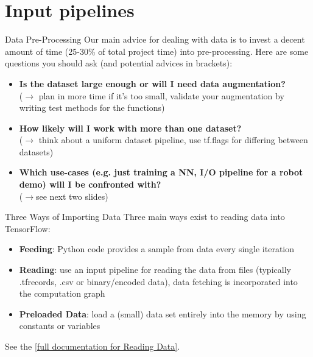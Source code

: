 \documentclass[18pt]{beamer}
\begin{document}
\section{Input pipelines}
\begin{frame}{Data Pre-Processing}
Our main advice for dealing with data is to invest a decent amount of time (25-30\% of total project time) into pre-processing. Here are some questions you should ask (and potential advices in brackets):
\begin{itemize}
\item \textbf{Is the dataset large enough or will I need data augmentation?}
\\($\rightarrow$ plan in more time if it's too small, validate your augmentation by writing test methods for the functions)
\pause
\item \textbf{How likely will I work with more than one dataset?}\\ ($\rightarrow$ think about a uniform dataset pipeline, use tf.flags for differing between datasets) 
\pause
\item \textbf{Which use-cases (e.g. just training a NN, I/O pipeline for a robot demo) will I be confronted with?} \\($\rightarrow$see next two slides)
\end{itemize}
 \end{frame}


\begin{frame}{Three Ways of Importing Data}
Three main ways exist to reading data into TensorFlow:
\begin{itemize}
\item \textbf{Feeding}: Python code provides a sample from data every single iteration
\pause
\item \textbf{Reading}: use an input pipeline for reading the data from files (typically .tfrecords, .csv or binary/encoded data), data fetching is incorporated into the computation graph
\pause
\item \textbf{Preloaded Data}: load a (small) data set entirely into the memory by using constants or variables
\end{itemize}
See the \textcolor{kitgreen}{ \href{https://www.tensorflow.org/versions/r1.2/programmers_guide/reading_data}{[full documentation for Reading Data]}}.
\end{frame}
\end{document}
